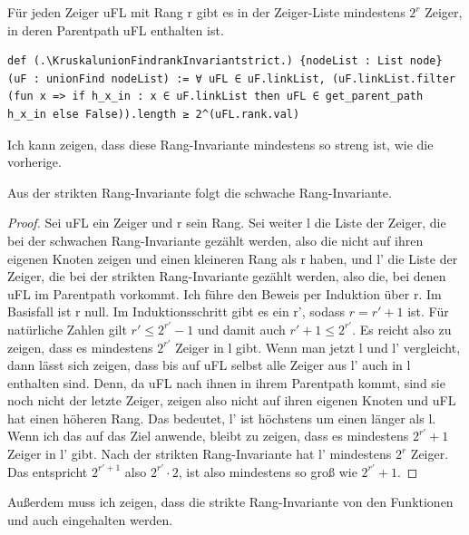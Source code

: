 \begin{definition}[\KruskalunionFindrankInvariantstrict]
  Für jeden Zeiger uFL mit Rang r gibt es in der Zeiger-Liste mindestens $2^r$ Zeiger, in deren Parentpath uFL enthalten ist.
\end{definition}
\begin{lstlisting}
def (.\KruskalunionFindrankInvariantstrict.) {nodeList : List node} (uF : unionFind nodeList) := ∀ uFL ∈ uF.linkList, (uF.linkList.filter (fun x => if h_x_in : x ∈ uF.linkList then uFL ∈ get_parent_path h_x_in else False)).length ≥ 2^(uFL.rank.val)
\end{lstlisting}

Ich kann zeigen, dass diese Rang-Invariante mindestens so streng ist, wie die vorherige.

\begin{lemma}[\KruskalunionFindrankInvariantofrankInvariantstrict]
  Aus der strikten Rang-Invariante folgt die schwache Rang-Invariante.
\end{lemma}
\begin{proof}
  Sei uFL ein Zeiger und r sein Rang.
  Sei weiter l die Liste der Zeiger, die bei der schwachen Rang-Invariante gezählt werden, also die nicht auf ihren eigenen Knoten zeigen und einen kleineren Rang als r haben,
  und l' die Liste der Zeiger, die bei der strikten Rang-Invariante gezählt werden, also die, bei denen uFL im Parentpath vorkommt.
  Ich führe den Beweis per Induktion über r.
  Im Basisfall ist r null.
  Im Induktionsschritt gibt es ein r', sodass $r = r' + 1$ ist.
  Für natürliche Zahlen gilt $r' \le 2^{r'} - 1$ und damit auch $r' + 1 \le 2^{r'}$.
  Es reicht also zu zeigen, dass es mindestens $2^{r'}$ Zeiger in l gibt.
  Wenn man jetzt l und l' vergleicht, dann lässt sich zeigen, dass bis auf uFL selbst alle Zeiger aus l' auch in l enthalten sind.
  Denn, da uFL nach ihnen in ihrem Parentpath kommt, sind sie noch nicht der letzte Zeiger, zeigen also nicht auf ihren eigenen Knoten und uFL hat einen höheren Rang.
  Das bedeutet, l' ist höchstens um einen länger als l.
  Wenn ich das auf das Ziel anwende, bleibt zu zeigen, dass es mindestens $2^{r'} + 1$ Zeiger in l' gibt.
  Nach der strikten Rang-Invariante hat l' mindestens $2^r$ Zeiger.
  Das entspricht $2^{r'+1}$ also $2^{r'}\cdot2$, ist also mindestens so groß wie $2^{r'} + 1$.
\end{proof}

Außerdem muss ich zeigen, dass die strikte Rang-Invariante von den Funktionen \KruskalinitunionFind und \KruskalupdateunionFind auch eingehalten werden.

